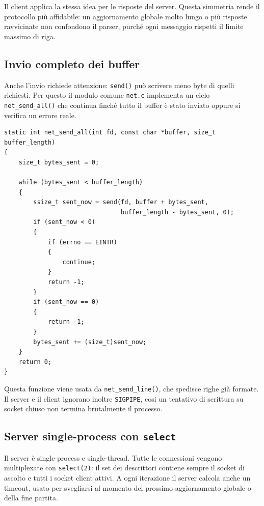 \documentclass[11pt,a4paper]{article}
\begin{document}
Il client applica la stessa idea per le risposte del server. Questa simmetria rende il protocollo più affidabile: un aggiornamento globale molto lungo o più risposte ravvicinate non confondono il parser, purché ogni messaggio rispetti il limite massimo di riga.

\subsection{Invio completo dei buffer}

Anche l'invio richiede attenzione: \texttt{send()} può scrivere meno byte di quelli richiesti. Per questo il modulo comune \texttt{net.c} implementa un ciclo \texttt{net\_send\_all()} che continua finché tutto il buffer è stato inviato oppure si verifica un errore reale.

\begin{lstlisting}[caption={Invio completo dei byte, tratto da \texttt{net.c}.}]
static int net_send_all(int fd, const char *buffer, size_t buffer_length)
{
    size_t bytes_sent = 0;

    while (bytes_sent < buffer_length)
    {
        ssize_t sent_now = send(fd, buffer + bytes_sent,
                                buffer_length - bytes_sent, 0);
        if (sent_now < 0)
        {
            if (errno == EINTR)
            {
                continue;
            }
            return -1;
        }
        if (sent_now == 0)
        {
            return -1;
        }
        bytes_sent += (size_t)sent_now;
    }
    return 0;
}
\end{lstlisting}

Questa funzione viene usata da \texttt{net\_send\_line()}, che spedisce righe già formate. Il server e il client ignorano inoltre \texttt{SIGPIPE}, cosi un tentativo di scrittura su socket chiuso non termina brutalmente il processo.

\subsection{Server single-process con \texttt{select}}

Il server è single-process e single-thread. Tutte le connessioni vengono multiplexate con \texttt{select(2)}: il set dei descrittori contiene sempre il socket di ascolto e tutti i socket client attivi. A ogni iterazione il server calcola anche un timeout, usato per svegliarsi al momento del prossimo aggiornamento globale o della fine partita.
\end{document}
